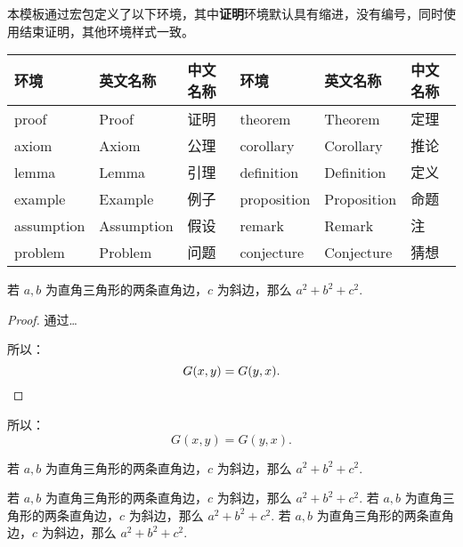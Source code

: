 本模板通过宏包定义了以下环境，其中\textbf{证明}环境默认具有缩进，没有编号，同时使用\clist{\qedhere}结束证明，其他环境样式一致。

\begin{table}[H]
  \begin{tabularx}{\textwidth}{YYY|YYY}
  \toprule
    环境 & 英文名称 & 中文名称 & 环境 & 英文名称 & 中文名称 \\
  \midrule
    proof & Proof & 证明 & theorem & Theorem & 定理 \\
    axiom & Axiom & 公理 & corollary & Corollary & 推论 \\
    lemma & Lemma & 引理 & definition & Definition & 定义 \\
    example & Example & 例子 & proposition & Proposition & 命题 \\
    assumption & Assumption & 假设 & remark & Remark & 注 \\
    problem & Problem & 问题 & conjecture & Conjecture & 猜想 \\
  \bottomrule
  \end{tabularx}
\end{table}


\begin{texcode}[]{}
  \begin{theorem}[勾股定理]\label{theorem:pt}
    若 $a,b$ 为直角三角形的两条直角边，$c$ 为斜边，那么 $a^2 + b^2 + c^2.$
  \end{theorem}

  \begin{proof}
    通过\ldots

    所以：
    \begin{equation*}
        G(x, y) = G(y, x).  \qedhere
    \end{equation*}
  \end{proof}
\end{texcode}

\begin{proposition}
  所以：
  \begin{equation*}
      G(x, y) = G(y, x).
  \end{equation*}
\end{proposition}

\begin{conjecture}[勾股定理]
    若 $a,b$ 为直角三角形的两条直角边，$c$ 为斜边，那么 $a^2 + b^2 + c^2.$
\end{conjecture}

\begin{axiom}[勾股定理]
    若 $a,b$ 为直角三角形的两条直角边，$c$ 为斜边，那么 $a^2 + b^2 + c^2.$ 若 $a,b$ 为直角三角形的两条直角边，$c$ 为斜边，那么 $a^2 + b^2 + c^2.$ 若 $a,b$ 为直角三角形的两条直角边，$c$ 为斜边，那么 $a^2 + b^2 + c^2.$
\end{axiom}

